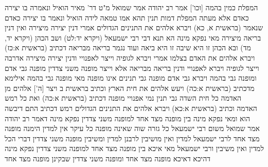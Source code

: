 \documentclass[12pt, openany]{book}
\begin{document}
{המפלת כמין בהמה [וכו']
אמר רב יהודה אמר שמואל מ"ט דר' מאיר הואיל ונאמרה בו יצירה כאדם 
אלא מעתה המפלת דמות תנין תהא אמו טמאה לידה הואיל ונאמר בו יצירה כאדם שנאמר (בראשית א, כא) ויברא אלהים את התנינים הגדולים 
אמרי דנין יצירה מיצירה ואין דנין בריאה מיצירה 
מאי נפקא מינה הא תנא דבי רבי ישמעאל (ויקרא יד:לט) ושב הכהן (ויקרא יד, מד) ובא הכהן זו היא שיבה זו היא ביאה 
ועוד נגמר בריאה מבריאה דכתיב (בראשית א:כז) ויברא אלהים את האדם בצלמו 
אמרי ויברא לגופיה וייצר לאפנויי ודנין יצירה מיצירה 
אדרבה וייצר לגופיה ויברא לאפנויי ודנין בריאה מבריאה 
אלא וייצר מופנה משני צדדין מופנה גבי אדם ומופנה גבי בהמה ויברא גבי אדם מופנה גבי תנינים אינו מופנה 
מאי מופנה גבי בהמה אילימא מדכתיב (בראשית א:כה) ויעש אלהים את חית הארץ וכתיב {בראשית ב } ויצר [ה'] אלהים מן האדמה כל חית השדה גבי תנין נמי אפנויי מופנה דכתיב (בראשית א:כה) ואת כל רמש האדמה וכתיב (בראשית א:כא) ויברא אלהים את התנינים הגדולים 
רמש דכתיב התם דיבשה הוא ומאי נפקא מינה בין מופנה מצד אחד למופנה משני צדדין 
נפקא מינה דאמר רב יהודה אמר שמואל משום רבי ישמעאל כל גזרה שוה שאינה מופנה כל עיקר אין למדין הימנה מופנה מצד אחד לרבי ישמעאל למדין ואין מושיבין לרבנן למדין ומשיבין מופנה משני צדדין דברי הכל למדין ואין משיבין 
ורבי ישמעאל מאי איכא בין מופנה מצד אחד למופנה משני צדדין נפקא מינה דהיכא דאיכא מופנה מצד אחד ומופנה משני צדדין שבקינן מופנה מצד אחד}
\end{document}
